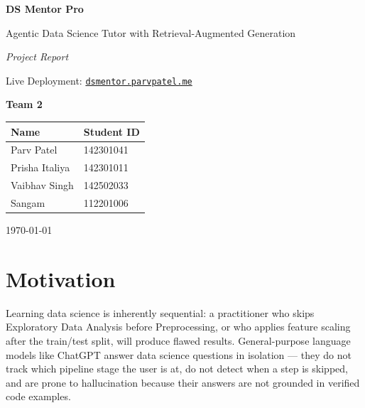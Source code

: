\documentclass[12pt,a4paper]{article}
\begin{document}
\begin{titlepage}
  \centering
  \vspace*{2cm}
  {\LARGE\bfseries DS Mentor Pro\par}
  \vspace{0.4cm}
  {\large Agentic Data Science Tutor with Retrieval-Augmented Generation\par}
  \vspace{0.3cm}
  {\normalsize\textit{Project Report}\par}
  \vspace{0.2cm}
  {\small Live Deployment: \href{https://dsmentor.parvpatel.me}{\texttt{dsmentor.parvpatel.me}}\par}
  \vspace{1.5cm}

  {\large\bfseries Team 2\par}
  \vspace{0.8cm}

  \begin{tabular}{ll}
    \toprule
    \textbf{Name} & \textbf{Student ID} \\
    \midrule
    Parv Patel    & 142301041 \\
    Prisha Italiya & 142301011 \\
    Vaibhav Singh & 142502033 \\
    Sangam        & 112201006 \\
    \bottomrule
  \end{tabular}

  \vfill
  {\small\today\par}
\end{titlepage}

\tableofcontents
\newpage

\section{Motivation}

Learning data science is inherently sequential: a practitioner who skips Exploratory Data Analysis before Preprocessing, or who applies feature scaling after the train/test split, will produce flawed results. General-purpose language models like ChatGPT answer data science questions in isolation --- they do not track which pipeline stage the user is at, do not detect when a step is skipped, and are prone to hallucination because their answers are not grounded in verified code examples.
\end{document}
